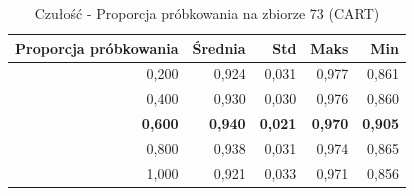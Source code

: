 \begin{table}[htbp]
\centering
\small
\setlength{\tabcolsep}{6pt}
\renewcommand{\arraystretch}{1.2}
\caption{Czułość - Proporcja próbkowania na zbiorze 73 (CART)}
\label{tab:CART_sample_ratio_73_recall}
\begin{tabular}{r|r|r|r|r}
\toprule
Proporcja próbkowania & Średnia & Std & Maks & Min \\
\hline
0,200 & 0,924 & 0,031 & 0,977 & 0,861 \\
0,400 & 0,930 & 0,030 & 0,976 & 0,860 \\
\textbf{0,600} & \textbf{0,940} & \textbf{0,021} & \textbf{0,970} & \textbf{0,905} \\
0,800 & 0,938 & 0,031 & 0,974 & 0,865 \\
1,000 & 0,921 & 0,033 & 0,971 & 0,856 \\
\bottomrule
\end{tabular}
\end{table}